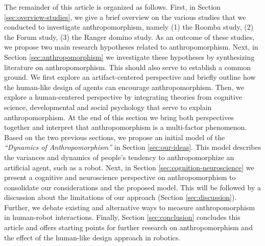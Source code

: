 \documentclass{frontiersSCNS} %
\begin{document}
The remainder of this article is organized as follows.  First, in Section
\ref{sec:overview-studies}, we give a brief overview on the various studies that
we conducted to investigate anthropomorphism, namely (1) the Roomba study, (2)
the Forum study, (3) the Ranger domino study. As an outcome of these studies, we
propose two main research hypotheses related to anthropomorphism.  Next, in
Section \ref{sec:anthropomorphism} we investigate these hypotheses by
synthesizing literature on anthropomorphism. This should also serve to establish
a common ground. We first explore an artifact-centered perspective and briefly
outline how the human-like design of agents can encourage anthropomorphism.
Then, we explore a human-centered perspective by integrating theories from
cognitive science, developmental and social psychology that serve to explain
anthropomorphism. At the end of this section we bring both perspectives together
and interpret that anthropomorphism is a multi-factor phenomenon.  Based on the
two previous sections, we propose an initial model of the \textit{``Dynamics of
Anthropomorphism''} in Section \ref{sec:our-ideas}. This model describes the
variances and dynamics of people's tendency to anthropomorphize an artificial
agent, such as a robot.  Next, in Section \ref{sec:cognition-neuroscience} we
present a cognitive and neuroscience perspective on anthropomorphism to
consolidate our considerations and the proposed model.  This will be followed by
a discussion about the limitations of our approach (Section
\ref{sec:discussion}). Further, we debate existing and alternative ways to
measure anthropomorphism in human-robot interactions.  Finally, Section
\ref{sec:conclusion} concludes this article and offers starting points for
further research on anthropomorphism and the effect of the human-like design
approach in robotics.
\end{document}

